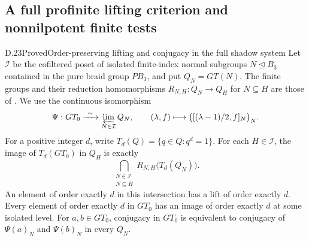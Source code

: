 \subsection{A full profinite lifting criterion and nonnilpotent finite tests}

\begin{claim}{D.23}{Proved}{Order-preserving lifting and conjugacy in the full shadow system}
Let $\mathcal I$ be the cofiltered poset of isolated finite-index normal
subgroups $N\unlhd B_3$ contained in the pure braid group $PB_3$, and put
$Q_N=GT(N)$.  The finite groups and their reduction homomorphisms
$R_{N,H}:Q_N\to Q_H$ for $N\subseteq H$ are those of
\cite[Proposition 3.14, Theorem 5.2 and Proposition 5.5]{A-DGShadows}.
We use the continuous isomorphism
\[
 \Psi:GT_0\xrightarrow{\ \sim\ }\varprojlim_{N\in\mathcal I}Q_N,
 \qquad (\lambda,f)\longmapsto
 \bigl([ (\lambda-1)/2,f]_N\bigr)_N.
\]
For a positive integer $d$, write $T_d(Q)=\{q\in Q:q^d=1\}$.
For each $H\in\mathcal I$, the image of $T_d(GT_0)$ in $Q_H$ is exactly
\[
 \bigcap_{\substack{N\in\mathcal I\\N\subseteq H}}
 R_{N,H}\bigl(T_d(Q_N)\bigr).                         \tag{D.23a}
\]
An element of order exactly $d$ in this intersection has a lift of
order exactly $d$. Every element of order exactly $d$ in $GT_0$ has
an image of order exactly $d$ at some isolated level.
For $a,b\in GT_0$, conjugacy in $GT_0$ is equivalent to conjugacy
of $\Psi(a)_N$ and $\Psi(b)_N$ in every $Q_N$.
\end{claim}
